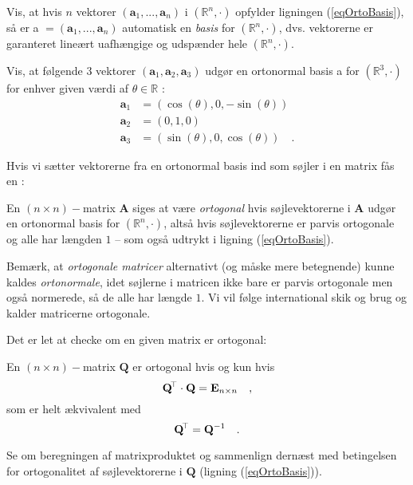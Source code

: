 \begin{exercise}
Vis, at hvis $n$ vektorer $( \mathbf{a}_{1}, . . . , \mathbf{a}_{n} )$ i $(\mathbb{R}^{n}, \bm{\cdot})$ opfylder ligningen (\ref{eqOrtoBasis}), så er
a $= ( \mathbf{a}_{1}, . . . , \mathbf{a}_{n} )$ automatisk en {\em{basis}} for $(\mathbb{R}^{n}, \bm{\cdot})$, dvs. vektorerne er garanteret lineært uafhængige og udspænder hele $(\mathbb{R}^{n}, \bm{\cdot})$.
\end{exercise}


\begin{exercise} \label{exercRotBasis}
Vis, at følgende $3$ vektorer $(\mathbf{a}_{1}, \mathbf{a}_{2}, \mathbf{a}_{3})$ udgør en ortonormal basis a for $(\mathbb{R}^{3}, \bm{\cdot})$  for enhver given værdi af
$\theta \in \mathbb{R}$ :
\begin{equation}
\begin{aligned}
\mathbf{a}_{1} &= (\cos(\theta), 0 , -\sin(\theta)) \\
\mathbf{a}_{2} &= (0, 1, 0) \\
\mathbf{a}_{3} &= (\sin(\theta), 0, \cos(\theta)) \quad .
\end{aligned}
\end{equation}
\end{exercise}

Hvis vi sætter vektorerne fra en ortonormal basis ind som søjler i en matrix fås en :

\begin{definition}\label{def_ortogonal_matrix}
En $(n \times n)-$matrix $\mathbf{A}$ siges at være {\em{ortogonal}} hvis søjlevektorerne i $\mathbf{A}$ udgør en
ortonormal basis for  $(\mathbb{R}^{n}, \bm{\cdot})$, altså hvis søjlevektorerne er parvis ortogonale og alle har længden $1$ -- som også udtrykt i ligning (\ref{eqOrtoBasis}).
\end{definition}

\begin{think}
Bemærk, at {\em{ortogonale matricer}} alternativt (og måske mere betegnende) kunne kaldes {\em{ortonormale}}, idet søjlerne i matricen ikke bare er parvis ortogonale men også normerede, så de alle har længde $1$. Vi vil følge international skik og brug og kalder matricerne ortogonale.
\end{think}

Det er let at checke om en given matrix er ortogonal:

\begin{theorem}
En $(n \times n)-$matrix $\mathbf{Q}$ er ortogonal hvis og kun hvis
\begin{equation}
\mathbf{Q}\hspace*{-.6mm}^{\top} \cdot \mathbf{Q} = \mathbf{E}_{n \times n} \quad ,
\end{equation}
som er helt ækvivalent med
\begin{equation}
\mathbf{Q}\hspace*{-.6mm}^{\top} = \mathbf{Q}^{-1}  \quad .
\end{equation}
\end{theorem}
\begin{bevis}
Se  om beregningen af matrixproduktet og sammenlign dernæst med betingelsen for ortogonalitet af søjlevektorerne i $\mathbf{Q}$ (ligning (\ref{eqOrtoBasis})).
\end{bevis}

